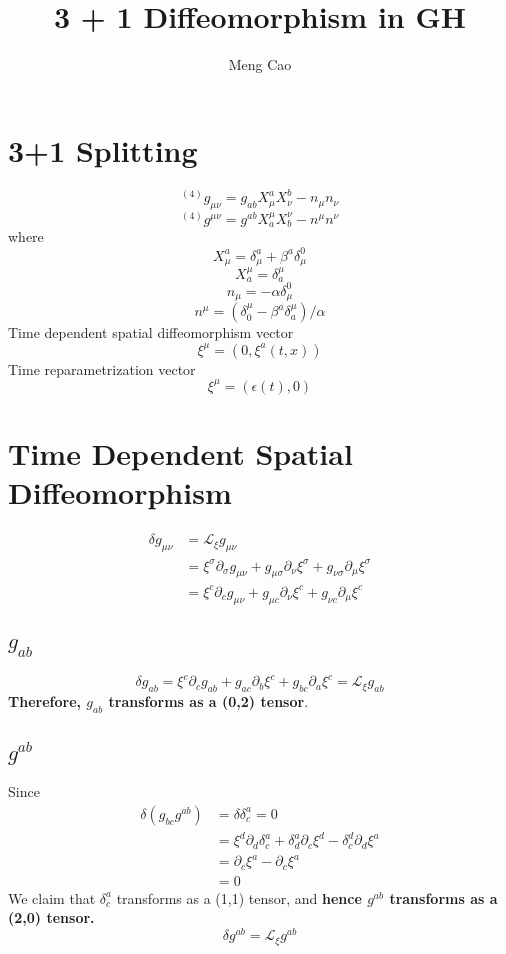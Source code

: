 \documentclass{article}
\begin{document}
\title{3 + 1 Diffeomorphism in GH}
\author{Meng Cao}
\maketitle
\section{3+1 Splitting}
\[
^{(4)}g_{\mu\nu} = g_{ab}X^{a}_{\mu}X^{b}_{\nu} - n_{\mu}n_{\nu}
\]
\[
^{(4)}g^{\mu\nu} = g^{ab}X^{\mu}_{a}X^{\nu}_{b} - n^{\mu}n^{\nu}
\]
where
\[
X^{a}_{\mu} = \delta^{a}_{\mu} + \beta^{a}\delta^{0}_{\mu} 
\]
\[
X^{\mu}_{a} = \delta^{\mu}_{a}
\]
\[
n_{\mu} = -\alpha \delta^{0}_{\mu}
\]
\[
n^{\mu} = (\delta^{\mu}_{0} - \beta^{a}\delta_{a}^{\mu})/\alpha
\]
Time dependent spatial diffeomorphism vector
\[
\xi^{\mu} = (0,\xi^{a}(t,x))
\]
Time reparametrization vector
\[
\xi^{\mu} = (\epsilon (t),0)
\]
\section{Time Dependent Spatial Diffeomorphism}

\begin{align*}
\delta g_{\mu\nu} & = \mathcal{L}_{\xi} g_{\mu\nu} \\
& = \xi^{\sigma} \partial_{\sigma}g_{\mu\nu} + g_{\mu\sigma}\partial_{\nu}\xi^{\sigma} + g_{\nu \sigma}\partial_{\mu}\xi^{\sigma}\\
& = \xi^{c}\partial_{c}g_{\mu\nu} + g_{\mu c}\partial_{\nu}\xi^{c} + g_{\nu c}\partial_{\mu}\xi^{c}
\end{align*}

\subsection{$g_{ab}$}
\[
\boxed{
\delta g_{ab} = \xi^{c}\partial_{c}g_{ab} + g_{ac}\partial_{b}\xi^{c} + g_{bc}\partial_{a}\xi^{c} = \mathcal{L}_{\xi}g_{ab}
}
\]
{\bf {\color{red} Therefore, $g_{ab}$ transforms as a (0,2) tensor}}.
\subsection{$g^{ab}$}
Since
\begin{align*}
\delta (g_{bc}g^{ab}) & = \delta \delta^{a}_{c} = 0\\
& = \xi^{d} \partial_{d} \delta^{a}_{c} + \delta^{a}_{d}\partial_{c}\xi^{d} - \delta^{d}_{c}\partial_{d}\xi^{a}\\
& = \partial_{c}\xi^{a} - \partial_{c}\xi^{a}\\
& = 0
\end{align*}
We claim that $\delta^{a}_{c}$ transforms as a (1,1) tensor, and {\bf {\color{red}hence $g^{ab}$ transforms as a (2,0) tensor.}}
\[
\boxed{
\delta g^{ab} = \mathcal{L}_{\xi}g^{ab}
}
\]
\end{document}
